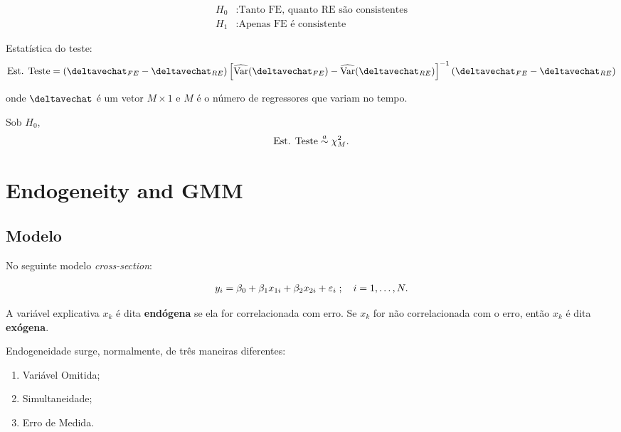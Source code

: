 \documentclass[11pt, oneside, a4paper, article]{article}
\numberwithin{equation}{section}
\begin{document}
\begin{description}
\begin{align*}
H_{0}&: \text{Tanto FE, quanto RE são consistentes}
\\    
H_{1}&: \text{Apenas FE é consistente}
\end{align*}

Estatística do teste:
\begin{align*}
\text{Est. Teste} =
\left( \deltavechat_{FE} - \deltavechat_{RE}  \right)
\left[ \Varhat(\deltavechat_{FE}) - \Varhat(\deltavechat_{RE})  \right]^{-1}
\left( \deltavechat_{FE} - \deltavechat_{RE}  \right)
\end{align*}

\noindent
onde $\deltavechat$ é um vetor $M \times 1$ e $M$ é o número de regressores que variam no tempo.

\noindent
Sob $H_{0}$, 
\begin{align*}
\text{Est. Teste} \overset{a}{\sim} \chi^{2}_{M}.
\end{align*}


\clearpage
\section{Endogeneity and GMM}


\subsection{Modelo}

No seguinte modelo \textit{cross-section}:

\vspace{-1 em}
\begin{align} \label{mod1}
y_{i} = \beta_{0} + \beta_{1} x_{1i} + \beta_{2} x_{2i} + \varepsilon_{i}
\; ; \quad i = 1, \dots, N.
\end{align}

\noindent
A variável explicativa $x_{k}$ é dita \textbf{endógena} se ela for correlacionada com erro.
Se $x_{k}$ for não correlacionada com o erro, então $x_{k}$ é dita \textbf{exógena}.

Endogeneidade surge, normalmente, de três maneiras diferentes:

\begin{enumerate}\itemsep0pt
\item Variável Omitida;
\item Simultaneidade;
\item Erro de Medida.
\end{enumerate}


\end{description}
\end{document}
